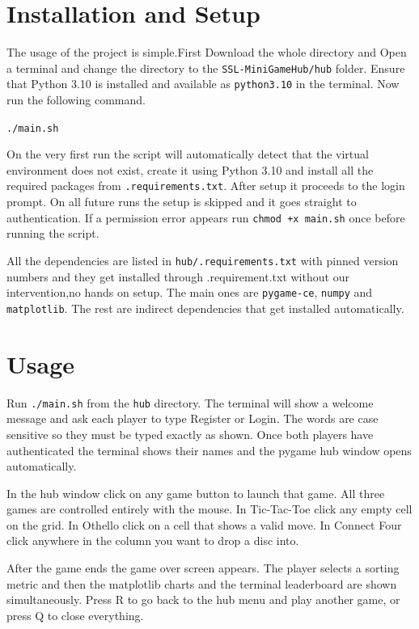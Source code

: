 \documentclass[12pt,a4paper]{article}
\begin{document}
\section{Installation and Setup}
\label{sec:setup}
The usage of the project is simple.First Download the whole directory and Open a terminal and change the directory to the \texttt{SSL-MiniGameHub/hub} folder. Ensure that Python 3.10 is installed and available as \texttt{python3.10} in the terminal. Now run the following command.

\begin{center}
\texttt{./main.sh}
\end{center}

On the very first run the script will automatically detect that the virtual environment does not exist, create it using Python 3.10 and install all the required packages from \texttt{.requirements.txt}. After setup it proceeds to the login prompt. On all future runs the setup is skipped and it goes straight to authentication. If a permission error appears run \texttt{chmod +x main.sh} once before running the script.

All the dependencies are listed in \texttt{hub/.requirements.txt} with pinned version numbers and they get installed through .requirement.txt without our intervention,no hands on setup. The main ones are \texttt{pygame-ce}, \texttt{numpy} and \texttt{matplotlib}. The rest are indirect dependencies that get installed automatically.


\section{Usage}
\label{sec:usage}

Run \texttt{./main.sh} from the \texttt{hub} directory. The terminal will show a welcome message and ask each player to type Register or Login. The words are case sensitive so they must be typed exactly as shown. Once both players have authenticated the terminal shows their names and the pygame hub window opens automatically.

In the hub window click on any game button to launch that game. All three games are controlled entirely with the mouse. In Tic-Tac-Toe click any empty cell on the grid. In Othello click on a cell that shows a valid move. In Connect Four click anywhere in the column you want to drop a disc into.

After the game ends the game over screen appears. The player selects a sorting metric and then the matplotlib charts and the terminal leaderboard are shown simultaneously. Press R to go back to the hub menu and play another game, or press Q to close everything.
\end{document}
